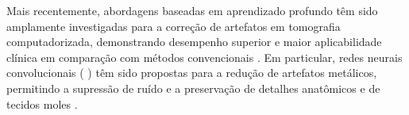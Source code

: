 Mais recentemente, abordagens baseadas em aprendizado profundo têm sido amplamente investigadas para a correção de artefatos em tomografia computadorizada, demonstrando desempenho superior e maior aplicabilidade clínica em comparação com métodos convencionais \cite{alkhodariEnhancingCCTAImage2025}.
Em particular, redes neurais convolucionais ( ) têm sido propostas para a redução de artefatos metálicos, permitindo a supressão de ruído e a preservação de detalhes anatômicos e de tecidos moles \cite{alkhodariEnhancingCCTAImage2025}.